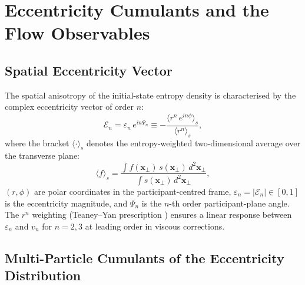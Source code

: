 \documentclass[12pt,a4paper,twoside]{report}
\newcommand{\mean}[1]{\langle #1 \rangle}
\begin{document}
\section{Eccentricity Cumulants and the Flow Observables}
\label{sec:eccentricities}

\subsection{Spatial Eccentricity Vector}
\label{subsec:eccentricity_def}

The spatial anisotropy of the initial-state entropy density is
characterised by the complex eccentricity vector of order $n$:
\begin{equation}
  \mathcal{E}_n = \varepsilon_n\, e^{in\Psi_n}
  \equiv -\frac{\mean{r^n\, e^{in\phi}}_s}{\mean{r^n}_s},
  \label{eq:eccentricity_vector}
\end{equation}
where the bracket $\mean{\cdot}_s$ denotes the entropy-weighted
two-dimensional average over the transverse plane:
\begin{equation}
  \mean{f}_s = \frac{\int f(\bm{x}_\perp)\, s(\bm{x}_\perp)\,
    d^2\bm{x}_\perp}{\int s(\bm{x}_\perp)\,d^2\bm{x}_\perp},
  \label{eq:entropy_weight}
\end{equation}
$(r, \phi)$ are polar coordinates in the participant-centred frame,
$\varepsilon_n = |\mathcal{E}_n| \in [0,1]$ is the eccentricity
magnitude, and $\Psi_n$ is the $n$-th order participant-plane angle.
The $r^n$ weighting (Teaney--Yan prescription \cite{Teaney2011})
ensures a linear response between $\varepsilon_n$ and $v_n$
for $n = 2, 3$ at leading order in viscous corrections.

\subsection{Multi-Particle Cumulants of the Eccentricity Distribution}
\label{subsec:eccentricity_cumulants}
\end{document}
